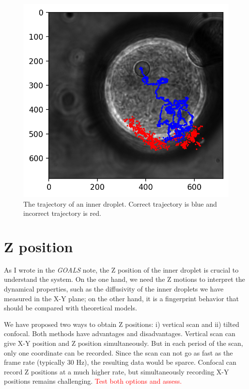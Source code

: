 \documentclass[onecolumn,aps, pre,amsmath,amssymb,longbibliography,11pt]{revtex4-2}
\begin{document}
\begin{figure}[h]
  \includegraphics{validated-traj.png}
  \caption{The trajectory of an inner droplet. Correct trajectory is blue and incorrect trajectory is red.}
  \label{fig:validated-traj}
\end{figure} 


\section{Z position}
As I wrote in the \textit{GOALS} note, the Z position of the inner droplet is crucial to understand the system.
On the one hand, we need the Z motions to interpret the dynamical properties, such as the diffusivity of the inner droplets we have measured in the X-Y plane;
on the other hand, it is a fingerprint behavior that should be compared with theoretical models.

We have proposed two ways to obtain Z positions: i) vertical scan and ii) tilted confocal.
Both methods have advantages and disadvantages.
Vertical scan can give X-Y position and Z position simultaneously.
But in each period of the scan, only one coordinate can be recorded.
Since the scan can not go as fast as the frame rate (typically 30 Hz), the resulting data would be sparce.
Confocal can record Z positions at a much higher rate, but simultaneously recording X-Y positions remains challenging.
\textcolor{red}{Test both options and assess.}
\end{document}
